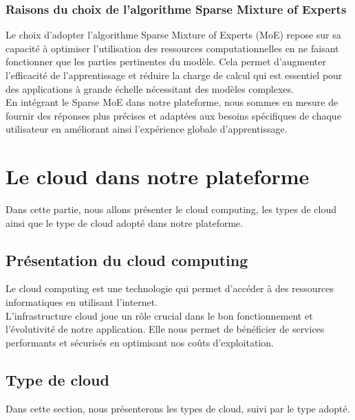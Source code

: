 \subsubsection{Raisons du choix de l'algorithme Sparse Mixture of Experts}
\justifying
Le choix d'adopter l'algorithme Sparse Mixture of Experts (MoE) repose sur sa capacité à optimiser l'utilisation des ressources computationnelles en ne faisant fonctionner que les parties pertinentes du modèle. Cela permet d'augmenter l'efficacité de l'apprentissage et réduire la charge de calcul qui est essentiel pour des applications à grande échelle nécessitant des modèles complexes.\\
En intégrant le Sparse MoE dans notre plateforme, nous sommes en mesure de fournir des réponses plus précises et adaptées aux besoins spécifiques de chaque utilisateur en améliorant ainsi l'expérience globale d'apprentissage.


\section{Le cloud dans notre plateforme}
\justifying
Dans cette partie, nous allons présenter le cloud computing, les types de cloud ainsi que le type de cloud adopté dans notre plateforme.

\subsection{Présentation du cloud computing}
\justifying
Le cloud computing est une technologie qui permet d'accéder à des ressources informatiques en utilisant l’internet.\\
L'infrastructure cloud joue un rôle crucial dans le bon fonctionnement et l'évolutivité de notre application. Elle nous permet de bénéficier de services performants et sécurisés en optimisant nos coûts d'exploitation.

\subsection{Type de cloud}
\justifying
Dans cette section, nous présenterons les types de cloud, suivi par le type adopté.

